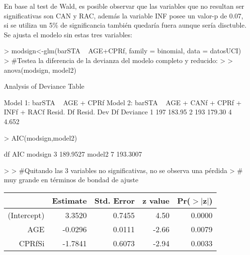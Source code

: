 \documentclass[11pt,onside]{article}
\begin{document}
\begin{itemize}
En base al test de Wald, es posible observar que las variables que no resultan ser significativas son CAN y RAC, además la variable INF posee un valor-p de 0.07, si se utiliza un 5\% de significancia también quedaría fuera aunque sería disctuble. Se ajusta el modelo sin estas tres variables:

\begin{Schunk}
\begin{Sinput}
> modsign<-glm(barSTA ~ AGE+CPRf, family = binomial, data = datosUCI)
> #Testea la diferencia de la devianza del modelo completo y reducido:
> 
> anova(modsign, model2)
\end{Sinput}
\begin{Soutput}
Analysis of Deviance Table

Model 1: barSTA ~ AGE + CPRf
Model 2: barSTA ~ AGE + CANf + CPRf + INFf + RACf
  Resid. Df Resid. Dev Df Deviance
1       197     183.95            
2       193     179.30  4    4.652
\end{Soutput}
\begin{Sinput}
> AIC(modsign,model2)
\end{Sinput}
\begin{Soutput}
        df      AIC
modsign  3 189.9527
model2   7 193.3007
\end{Soutput}
\begin{Sinput}
> 
> #Quitando las 3 variables no significativas, no se observa una pérdida
> # muy grande en términos de bondad de ajuste
\end{Sinput}
\end{Schunk}

\begin{Schunk}
\begin{Soutput}
% latex table generated in R 4.0.5 by xtable 1.8-4 package
% Thu Jun 10 14:15:59 2021
\begin{table}[ht]
\centering
\begin{tabular}{rrrrr}
  \hline
 & Estimate & Std. Error & z value & Pr($>$$|$z$|$) \\ 
  \hline
(Intercept) & 3.3520 & 0.7455 & 4.50 & 0.0000 \\ 
  AGE & -0.0296 & 0.0111 & -2.66 & 0.0079 \\ 
  CPRfSi & -1.7841 & 0.6073 & -2.94 & 0.0033 \\ 
   \hline
\end{tabular}
\end{table}
\end{Soutput}
\end{Schunk}


\end{itemize}
\end{document}
